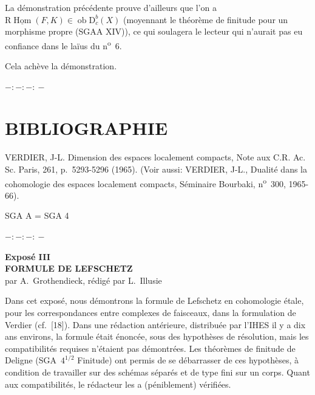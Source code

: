 \documentclass[11pt]{article}
\DeclareMathOperator{\Hom}{Hom}
\newcommand{\R}{\mathrm{R}}\newcommand{\RHomCore}{\mathrm{RHom}}
\newcommand{\D}{\mathrm{D}}
\newcommand{\ob}{\operatorname{ob}}
\providecommand{\RHom}{\RHomCore}
\providecommand{\uRHom}{\underline{\RHom}}
\providecommand{\RHom}{\RHomCore}
\providecommand{\Hom}{\operatorname{Hom}}
\providecommand{\ob}{\operatorname{ob}}
\providecommand{\RHom}{\R\mathcal{H}om}
\providecommand{\R}{\mathrm R}
\providecommand{\RHom}{\RHomCore}
\providecommand{\Hom}{\operatorname{Hom}}
\begin{document}
La démonstration précédente prouve d'ailleurs que l'on a $\R\underline{\Hom}(F,K)\in\ob\D_c^b(X)$ (moyennant le théorème de finitude pour un morphisme propre (SGAA XIV)), ce qui soulagera le lecteur qui n'aurait pas eu confiance dans le laïus du n\textsuperscript{o}~6.

Cela achève la démonstration.

\begin{center}
$-:\!-:\!-:\!-$
\end{center}

\section*{BIBLIOGRAPHIE}

\begin{enumerate}[label={[\arabic*]}]
\item VERDIER, J-L. Dimension des espaces localement compacts, Note aux C.R. Ac. Sc. Paris, 261, p.~5293-5296 (1965). (Voir aussi: VERDIER, J-L., Dualité dans la cohomologie des espaces localement compacts, Séminaire Bourbaki, n\textsuperscript{o}~300, 1965-66).
\end{enumerate}

SGA A = SGA 4

\begin{center}
$-:\!-:\!-:\!-$
\end{center}

\clearpage
\begin{center}
{\Large \textbf{Exposé III}}\\[0.4em]
{\large \textbf{FORMULE DE LEFSCHETZ}}\\[0.3em]
par A.~Grothendieck, rédigé par L.~Illusie
\end{center}
\renewenvironment{statement}[1]{\par\medskip\noindent\textbf{#1}\ }{\par\medskip}
\renewenvironment{prooftext}[1][Proof]{\par\noindent\emph{#1}\ }{\par\medskip}
\renewcommand{\uRHom}{\mathrm{R}\underline{\mathrm{Hom}}}

Dans cet exposé, nous démontrons la formule de Lefschetz en cohomologie étale, pour les correspondances entre complexes de faisceaux, dans la formulation de Verdier (cf.~[18]). Dans une rédaction antérieure, distribuée par l'IHES il y a dix ans environs, la formule était énoncée, sous des hypothèses de résolution, mais les compatibilités requises n'étaient pas démontrées. Les théorèmes de finitude de Deligne (SGA~$4^{1/2}$ Finitude) ont permis de se débarrasser de ces hypothèses, à condition de travailler sur des schémas séparés et de type fini sur un corps. Quant aux compatibilités, le rédacteur les a (péniblement) vérifiées.
\end{document}
